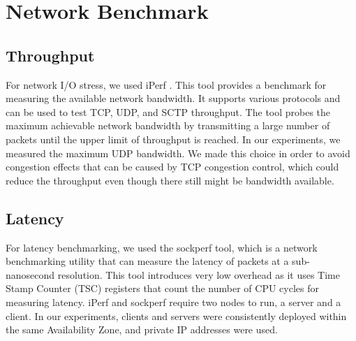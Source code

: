 \section{Network Benchmark}
\subsection{Throughput}
For network I/O stress, we used iPerf \cite{iperf}. This tool provides a benchmark for measuring the 
available network bandwidth. It supports various protocols and can be used to test TCP, UDP, and SCTP 
throughput. The tool probes the maximum achievable network bandwidth by transmitting a large number of packets 
until the upper limit of throughput is reached. In our experiments, we measured the maximum UDP 
bandwidth. We made this choice in order to avoid congestion effects that can be caused by TCP congestion 
control, which could reduce the throughput even though there still might be bandwidth available. 
\subsection{Latency}
For latency benchmarking, we used the sockperf tool, which is a network benchmarking utility that can measure the 
latency of packets at a sub-nanosecond resolution. This tool introduces very low overhead as it uses 
Time Stamp Counter (TSC) registers that count the number of CPU cycles for measuring latency.   
iPerf and sockperf require two nodes to run, a server and a client. In our experiments, clients and 
servers were consistently deployed within the same Availability Zone, and private IP addresses were used.
